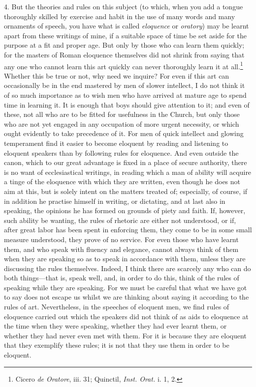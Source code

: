 4. But the theories and rules on this subject (to which, when you add a tongue thoroughly skilled by exercise and habit in the use of many words and many ornaments of speech, you have what is called \emph{eloquence} or \emph{oratory}) may be learnt apart from these writings of mine, if a suitable space of time be set aside for the purpose at a fit and proper age. But only by those who can learn them quickly; for the masters of Roman eloquence themselves did not shrink from saying that any one who cannot learn this art quickly can never thoroughly learn it at all.\footnote{Cicero \emph{de Oratore}, iii. 31; Quinctil, \emph{Inst. Orat.} i. 1, 2.} Whether this be true or not, why need we inquire? For even if this art can occasionally be in the end mastered by men of slower intellect, I do not think it of so much importance as to wish men who have arrived at mature age to spend time in learning it. It is enough that boys should give attention to it; and even of these, not all who are to be fitted for usefulness in the Church, but only those who are not yet engaged in any occupation of more urgent necessity, or which ought evidently to take precedence of it. For men of quick intellect and glowing temperament find it easier to become eloquent by reading and listening to eloquent speakers than by following rules for eloquence. And even outside the canon, which to our great advantage is fixed in a place of secure authority, there is no want of ecclesiastical writings, in reading which a man of ability will acquire a tinge of the eloquence with which they are written, even though he does not aim at this, but is solely intent on the matters treated of; especially, of course, if in addition he practise himself in writing, or dictating, and at last also in speaking, the opinions he has formed on grounds of piety and faith. If, however, such ability be wanting, the rules of rhetoric are either not understood, or if, after great labor has been spent in enforcing them, they come to be in some small measure understood, they prove of no service. For even those who have learnt them, and who speak with fluency and elegance, cannot always think of them when they are speaking so as to speak in accordance with them, unless they are discussing the rules themselves. Indeed, I think there are scarcely any who can do both things—that is, speak well, and, in order to do this, think of the rules of speaking while they are speaking. For we must be careful that what we have got to say does not escape us whilst we are thinking about saying it according to the rules of art. Nevertheless, in the speeches of eloquent men, we find rules of eloquence carried out which the speakers did not think of as aids to eloquence at the time when they were speaking, whether they had ever learnt them, or whether they had never even met with them. For it is because they are eloquent that they exemplify these rules; it is not that they use them in order to be eloquent.

